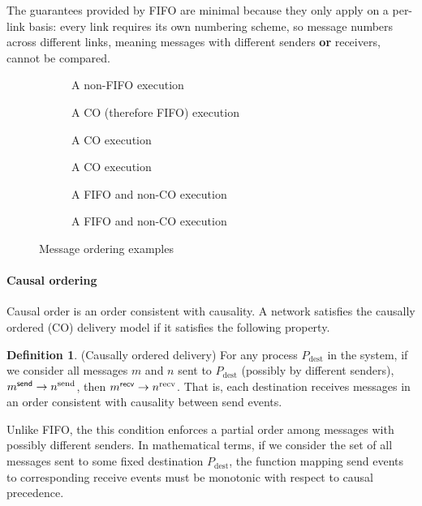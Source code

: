 \documentclass[]             %
{NASA}                       %
\theoremstyle{definition}
\newtheorem{definition}{Definition}[section]
\begin{document}
The guarantees provided by FIFO are minimal because they only apply on
a per-link basis: every link requires its own numbering scheme, so
message numbers across different links, meaning messages with
different senders \textbf{or} receivers, cannot be compared.

\begin{figure}[p]
  \setlength\abovecaptionskip{0ex}
  \setlength\belowcaptionskip{4ex}
  \begin{subfigure}[t]{0.475\textwidth}
    \centering
    
    \caption{A non-FIFO execution}
    \label{fig:ordex-non-fifo}
  \end{subfigure}
  \begin{subfigure}[t]{0.475\textwidth}
  \centering
  
  \caption{A CO (therefore FIFO) execution}
  \label{fig:ordex-co-1}
\end{subfigure}
\begin{subfigure}[b]{0.475\textwidth}
  \centering
  
  \caption{A CO execution}
  \label{fig:ordex-co-2}
\end{subfigure}
\begin{subfigure}[b]{0.475\textwidth}
  \centering
  
  \caption{A CO execution}
  \label{fig:ordex-co-3}
\end{subfigure}
\begin{subfigure}[b]{0.475\textwidth}
  \centering
  
  \caption{A FIFO and non-CO execution}
  \label{fig:ordex-non-co-1}
\end{subfigure}\hfill
\begin{subfigure}[b]{0.475\textwidth}
  \centering
  
  \caption{A FIFO and non-CO execution}
  \label{fig:ordex-non-co-2}
\end{subfigure}
\caption{Message ordering examples}
\label{fig:message-ordering}
\end{figure}

\paragraph{Causal ordering}
Causal order is an order consistent with causality. A network
satisfies the causally ordered (CO) delivery model if it satisfies the
following property.
\begin{definition}(Causally ordered delivery)
  \label{def:causalorder}
  For any process $P_\mathrm{dest}$ in the system, if we consider all
  messages $m$ and $n$ sent to $P_\mathrm{dest}$ (possibly by
  different senders), $m_{}^{\mathsf{send}} \to n^\textrm{send}$, then
  $m_{}^{\mathsf{recv}} \to n^\textrm{recv}$. That is, each destination
  receives messages in an order consistent with causality between send
  events.
\end{definition}
Unlike FIFO, the this condition enforces a partial order among
messages with possibly different senders. In mathematical terms, if
we consider the set of all messages sent to some fixed destination
$P_{\mathrm{dest}}$, the function mapping send events to corresponding
receive events must be monotonic with respect to causal precedence.
\end{document}
